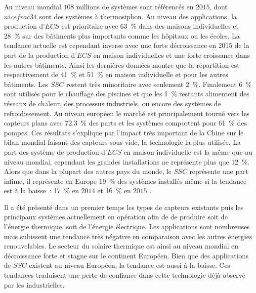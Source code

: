 Au niveau mondial $108$ millions de systèmes sont référencés en $2015$, dont $nicefrac{3}{4}$
sont des systèmes à thermosiphon.
Au niveau des applications, la production d’$ECS$ est prioritaire avec \SI{63}{\percent}
dans des maisons individuelles et \SI{28}{\percent} sur des bâtiments plus importants comme
les hôpitaux ou les écoles. La tendance actuelle est cependant inverse avec une forte
décroissance en $2015$ de la part de la production d’$ECS$ en maison individuelles
et une forte croissance dans les autres bâtiments. Ainsi les dernières données montre que
la répartition est respectivement de \SI{41}{\percent} et \SI{51}{\percent} en maison
individuelle et pour les autres bâtiments.
Les $SSC$ restent très minoritaire avec seulement \SI{2}{\percent}.
Finalement \SI{6}{\percent} sont utilisés pour le chauffage des piscines et que les \SI{1}{\percent}
restants alimentent des réseaux de chaleur, des processus industriels, ou encore des systèmes de
refroidissement.
Au niveau européen le marché est principalement tourné vers les capteurs plans avec \SI{72.3}{\percent}
des parts et les systèmes comportent pour \SI{61}{\percent} des pompes.
Ces résultats s’explique par l’impact très important de la Chine sur le bilan mondial faisant
des capteurs sous vide, la technologie la plus utilisée.
La part des système de production d’$ECS$ en maison individuelle est la même que au niveau mondial,
cependant les grandes installations ne représente plus que \SI{12}{\percent}. Alors que
dans la plupart des autres pays du monde, le $SSC$ représente une part infime, il
représente en Europe \SI{19}{\percent} des systèmes installés même si la tendance est à
la baisse~: \SI{17}{\percent} en $2014$ \parencite{Mauthner2016} et \SI{16}{\percent} en
$2015$ \parencite{Weiss2017}.

Il a été présenté dans un premier temps les types de capteurs existants puis les
principaux  systèmes actuellement en opération afin de de produire soit de l’énergie
thermique, soit de l’énergie électrique. Les applications sont nombreuses mais subissent
une tendance très négative en comparaison avec les autres énergies renouvelables.
Le secteur du solaire thermique est ainsi au niveau mondial en décroissance forte
et stagne sur le continent Européen. Bien que des applications de $SSC$ existent
au niveau Européen, la tendance est aussi à la baisse. Ces tendances traduisent
une perte de confiance dans cette technologie déjà observé par les industrielles.



